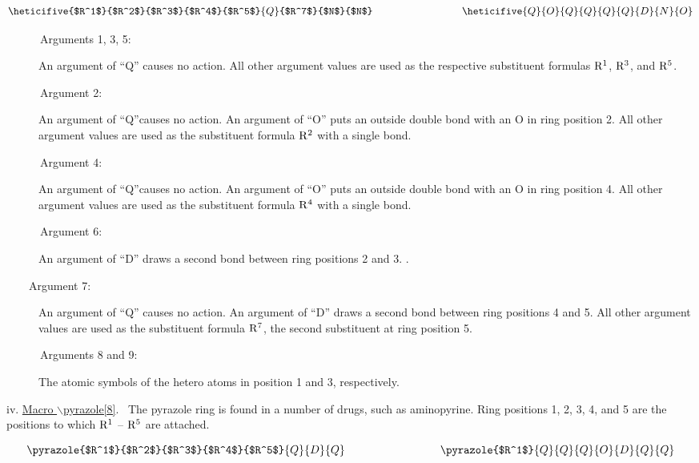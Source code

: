  \[ \heticifive{$R^1$}{$R^2$}{$R^3$}{$R^4$}{$R^5$}{Q}{$R^7$}
    {$N$}{$N$}     \hspace{3cm}
    \heticifive{Q}{O}{Q}{Q}{Q}{Q}{D}{N}{O} \]

 \begin{description}
 \item[{\rm \ \ \ \ \ \ Arguments 1, 3, 5:}] An argument of ``Q''
      causes no action. All other argument values are used as 
      the respective substituent formulas ${\rm R^1}$, ${\rm R^3}$,     
      and ${\rm R^5}$. 
 \item[{\rm \ \ \ \ \ \ Argument 2:}] An argument of ``Q''causes no
      action. An argument of ``O'' puts an outside double bond
      with an O in ring position 2. All other argument values
      are used as the substituent formula ${\rm R^2}$ with
      a single bond.
 \item[{\rm \ \ \ \ \ \ Argument 4:}] An argument of ``Q''causes
      no action. An argument of ``O'' puts an outside double bond
      with an O in ring position 4. All other argument values
      are used as the substituent formula ${\rm R^4}$ with a 
      single bond.
 \item[{\rm \ \ \ \ \ \ Argument 6:}] An argument of ``D'' draws 
      a second bond between ring positions 2 and 3. \ri .
 \item[{\rm \ \ \ \ Argument 7:}] An argument of ``Q'' causes
      no action. An argument of ``D'' draws a second bond
      between ring positions 4 and 5. All other argument values
      are used as the substituent formula ${\rm R^7}$, the second
      substituent at ring position 5.
 \item[{\rm \ \ \ \ \ \ Arguments 8 and 9:}] The atomic symbols of the
      hetero atoms in position 1 and 3, respectively.
 \end{description}

 \vspace{\len mm}
 \newpage
 \indent iv. \underline{Macro $\backslash $pyrazole[8]}.
 \ The pyrazole ring is found in a number of drugs, such as
 aminopyrine. Ring positions 1, 2, 3, 4, and 5 are the 
 positions to which ${\rm R^1}$ -- ${\rm R^5}$ are attached.
    

 \[ \pyrazole{$R^1$}{$R^2$}{$R^3$}{$R^4$}{$R^5$}{Q}{D}{Q}
    \hspace{3cm}
    \pyrazole{$R^1$}{Q}{Q}{Q}{O}{D}{Q}{Q}  \]

